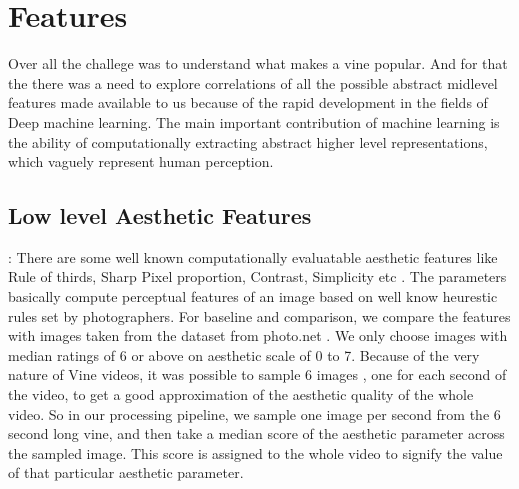 \section{Features}

Over all the challege was to understand what makes a vine popular. And for that the there was a need to explore correlations of all the possible abstract midlevel features made available to us because of the rapid development in the fields of Deep machine learning. The main important contribution of machine learning is the ability of computationally extracting abstract higher level representations, which vaguely represent human perception. 

\subsection{Low level Aesthetic Features}:
There are some well known computationally evaluatable aesthetic features like Rule of thirds, Sharp Pixel proportion, Contrast, Simplicity etc \cite{yeh2010personalized}. The parameters basically compute perceptual features of an image based on well know heurestic rules set by photographers. For baseline and comparison, we compare the features with images taken from the dataset from photo.net \cite{datta2008algorithmic}. We only choose images with median ratings of 6 or above on aesthetic scale of 0 to 7. 
Because of the very nature of Vine videos, it was possible to sample 6 images , one for each second of the video, to get a good approximation of the aesthetic quality of the whole video. So in our processing pipeline, we sample one image per second from the 6 second long vine, and then take a median score of the aesthetic parameter across the sampled image. This score is assigned to the whole video to signify the value of that particular aesthetic parameter. 

